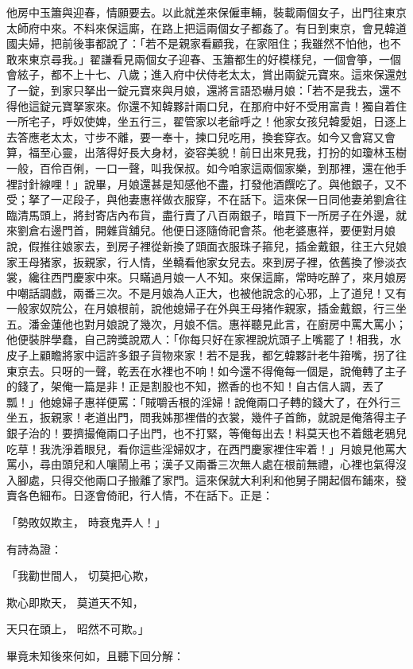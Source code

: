 他房中玉簫與迎春，情願要去。以此就差來保僱車輛，裝載兩個女子，出門往東京太師府中來。不料來保這廝，在路上把這兩個女子都姦了。有日到東京，會見韓道國夫婦，把前後事都說了：「若不是親家看顧我，在家阻住；我雖然不怕他，也不敢來東京尋我。」翟謙看見兩個女子迎春、玉簫都生的好模樣兒，一個會箏，一個會絃子，都不上十七、八歲；進入府中伏侍老太太，賞出兩錠元寶來。這來保還尅了一錠，到家只拏出一錠元寶來與月娘，還將言語恐嚇月娘：「若不是我去，還不得他這錠元寶拏家來。你還不知韓夥計兩口兒，在那府中好不受用富貴！獨自着住一所宅子，呼奴使婢，坐五行三，翟管家以老爺呼之！他家女孩兒韓愛姐，日逐上去答應老太太，寸步不離，要一奉十，揀口兒吃用，換套穿衣。如今又會寫又會算，福至心靈，出落得好長大身材，姿容美貌！前日出來見我，打扮的如瓊林玉樹一般，百伶百俐，一口一聲，叫我保叔。如今咱家這兩個家樂，到那裡，還在他手裡討針線哩！」說畢，月娘還甚是知感他不盡，打發他酒饌吃了。與他銀子，又不受；拏了一疋段子，與他妻惠祥做衣服穿，不在話下。這來保一日同他妻弟劉倉往臨清馬頭上，將封寄店內布貨，盡行賣了八百兩銀子，暗買下一所房子在外邊，就來劉倉右邊門首，開雜貨舖兒。他便日逐隨倚祀會茶。他老婆惠祥，要便對月娘說，假推往娘家去，到房子裡從新換了頭面衣服珠子箍兒，插金戴銀，往王六兒娘家王母猪家，扳親家，行人情，坐轎看他家女兒去。來到房子裡，依舊換了慘淡衣裳，纔往西門慶家中來。只瞞過月娘一人不知。來保這廝，常時吃醉了，來月娘房中嘲話調戲，兩番三次。不是月娘為人正大，也被他說念的心邪，上了道兒！又有一般家奴院公，在月娘根前，說他媳婦子在外與王母猪作親家，插金戴銀，行三坐五。潘金蓮他也對月娘說了幾次，月娘不信。惠祥聽見此言，在廚房中罵大罵小；他便裝胖學蠢，自己誇獎說眾人：「你每只好在家裡說炕頭子上嘴罷了！相我，水皮子上顧瞻將家中這許多銀子貨物來家！若不是我，都乞韓夥計老牛箝嘴，拐了往東京去。只呀的一聲，乾丟在水裡也不响！如今還不得俺每一個是，說俺轉了主子的錢了，架俺一篇是非！正是割股也不知，撚香的也不知！自古信人調，丟了瓢！」他媳婦子惠祥便罵：「賊嚼舌根的淫婦！說俺兩口子轉的錢大了，在外行三坐五，扳親家！老道出門，問我姊那裡借的衣裳，幾件子首飾，就說是俺落得主子銀子治的！要擠撮俺兩口子出門，也不打緊，等俺每出去！料莫天也不着餓老鴉兒吃草！我洗淨着眼兒，看你這些淫婦奴才，在西門慶家裡住牢着！」月娘見他罵大罵小，尋由頭兒和人嚷鬧上弔；漢子又兩番三次無人處在根前無禮，心裡也氣得沒入腳處，只得交他兩口子搬離了家門。這來保就大利利和他舅子開起個布鋪來，發賣各色細布。日逐會倚祀，行人情，不在話下。正是：

「勢敗奴欺主，  時衰鬼弄人！」

有詩為證：

「我勸世間人，  切莫把心欺，

欺心即欺天，  莫道天不知，

天只在頭上，  昭然不可欺。」

畢竟未知後來何如，且聽下回分解：

